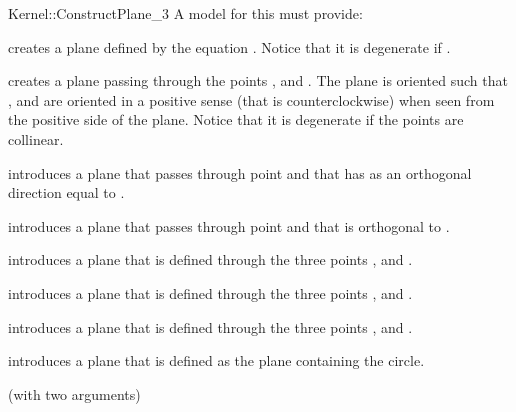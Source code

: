 \begin{ccRefFunctionObjectConcept}{Kernel::ConstructPlane_3}
A model for this must provide:


{creates a plane defined by the equation
 .
Notice that it is degenerate if .}

{creates a plane passing through the points ,
  and . The plane is oriented such that , 
  and  are oriented in a positive sense 
 (that is counterclockwise) when seen from the positive side of the plane.
Notice that it is degenerate if the points are collinear.}


{introduces a plane that passes through point  and
 that has as an orthogonal direction equal to .}

{introduces a plane that passes through point  and
 that is orthogonal to .}

{introduces a plane that is defined through the three points 
 ,  and .}

{introduces a plane that is defined through the three points 
 ,  and .}

{introduces a plane that is defined through the three points 
 ,  and .}

{introduces a plane that is defined as the plane containing the circle.}

\ccRefines
{} (with two arguments)

\ccSeeAlso
{} \\

\end{ccRefFunctionObjectConcept}
